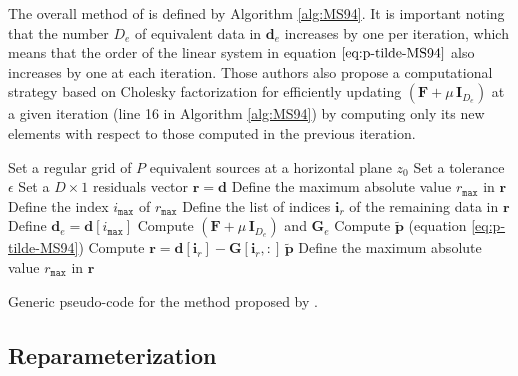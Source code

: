 The overall method of \cite{mendonca-silva1994} is defined by Algorithm \ref{alg:MS94}.
It is important noting that the number $D_{e}$ of equivalent data in $\mathbf{d}_{e}$ increases by one per iteration,
which means that the order of the linear system in equation $\ref{eq:p-tilde-MS94}$ also increases by one at each iteration.
Those authors also propose a computational strategy based on Cholesky factorization \cite[e.g.,][p. 163]{golub-vanloan2013}
for efficiently updating 
$\left(\mathbf{F} + \mu \, \mathbf{I}_{D_{e}} \right)$ at a given iteration (line 16 in Algorithm \ref{alg:MS94}) 
by computing only its new elements with respect to those computed in the previous iteration.

\begin{algorithm}
	\Input{}
	Set a regular grid of $P$ equivalent sources at a horizontal plane $z_{0}$ \;
	Set a tolerance $\epsilon$ \;
	Set a $D \times 1$ residuals vector $\mathbf{r} = \mathbf{d}$ \;
	Define the maximum absolute value $r_{\mathtt{max}}$ in $\mathbf{r}$ \; 
	Define the index $i_{\mathtt{max}}$ of $r_{\mathtt{max}}$ \;
	Define the list of indices $\mathbf{i}_{r}$ of the remaining data in $\mathbf{r}$ \;
	Define $\mathbf{d}_{e} = \mathbf{d}[i_{\mathtt{max}}] $ \;
	Compute $\left(\mathbf{F} + \mu \, \mathbf{I}_{D_{e}} \right)$ and $\mathbf{G}_{e}$ \;
	Compute $\tilde{\mathbf{p}}$ (equation \ref{eq:p-tilde-MS94}) \;
	Compute $\mathbf{r} = \mathbf{d}[\mathbf{i}_{r}] - \mathbf{G}[\mathbf{i}_{r}, :] \, \tilde{\mathbf{p}}$ \;
	Define the maximum absolute value $r_{\mathtt{max}}$ in $\mathbf{r}$ \; 
	\caption{Generic pseudo-code for the method proposed by \cite{mendonca-silva1994}.}
	\label{alg:MS94}
\end{algorithm}

\subsection{Reparameterization}

